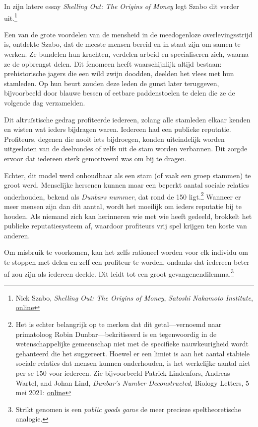 \documentclass[
  a5paper,
  smalldemyvopaper,11pt,twoside,onecolumn,openright,extrafontsizes,
hidelinks]{memoir}
\begin{document}
In zijn latere essay \emph{Shelling Out: The Origins of Money} legt
Szabo dit verder uit.\footnote{Nick Szabo, \emph{Shelling Out: The
  Origins of Money}, \emph{Satoshi Nakamoto Institute},
  \href{https://nakamotoinstitute.org/library/shelling-out/}{online}}

Een van de grote voordelen van de mensheid in de meedogenloze
overlevingsstrijd is, ontdekte Szabo, dat de meeste mensen bereid en in
staat zijn om samen te werken. Ze bundelen hun krachten, verdelen arbeid
en specialiseren zich, waarna ze de opbrengst delen. Dit fenomeen heeft
waarschijnlijk altijd bestaan: prehistorische jagers die een wild zwijn
doodden, deelden het vlees met hun stamleden. Op hun beurt zouden deze
leden de gunst later teruggeven, bijvoorbeeld door blauwe bessen of
eetbare paddenstoelen te delen die ze de volgende dag verzamelden.

Dit altruïstische gedrag profiteerde iedereen, zolang alle stamleden
elkaar kenden en wisten wat ieders bijdragen waren. Iedereen had een
publieke reputatie. Profiteurs, degenen die nooit iets bijdroegen,
konden uiteindelijk worden uitgesloten van de deelrondes of zelfs uit de
stam worden verbannen. Dit zorgde ervoor dat iedereen sterk gemotiveerd
was om bij te dragen.

Echter, dit model werd onhoudbaar als een stam (of vaak een groep
stammen) te groot werd. Menselijke hersenen kunnen maar een beperkt
aantal sociale relaties onderhouden, bekend als \emph{Dunbars nummer},
dat rond de 150 ligt.\footnote{Het is echter belangrijk op te merken dat
  dit getal---vernoemd naar primatoloog Robin Dunbar---bekritiseerd is
  en tegenwoordig in de wetenschappelijke gemeenschap niet met de
  specifieke nauwkeurigheid wordt gehanteerd die het suggereert. Hoewel
  er een limiet is aan het aantal stabiele sociale relaties dat mensen
  kunnen onderhouden, is het werkelijke aantal niet per se 150 voor
  iedereen. Zie bijvoorbeeld Patrick Lindenfors, Andreas Wartel, and
  Johan Lind, \emph{Dunbar's Number Deconstructed}, Biology Letters, 5
  mei 2021:
  \href{https://royalsocietypublishing.org/doi/10.1098/rsbl.2021.0158}{online}}
Wanneer er meer mensen zijn dan dit aantal, wordt het moeilijk om ieders
reputatie bij te houden. Als niemand zich kan herinneren wie met wie
heeft gedeeld, brokkelt het publieke reputatiesysteem af, waardoor
profiteurs vrij spel krijgen ten koste van anderen.

Om misbruik te voorkomen, kan het zelfs rationeel worden voor elk
individu om te stoppen met delen en zelf een profiteur te worden,
ondanks dat iedereen beter af zou zijn als iedereen deelde. Dit leidt
tot een groot gevangenendilemma.\footnote{Strikt genomen is een
  \emph{public goods game} de meer precieze speltheoretische analogie.}
\end{document}
